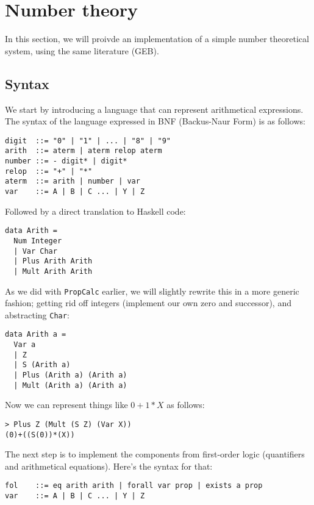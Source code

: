 \documentclass{article}
\begin{document}
\section{Number theory}

In this section, we will proivde an implementation of a simple number theoretical system, using the same literature (GEB).

\subsection{Syntax}

We start by introducing a language that can represent arithmetical expressions. The syntax of the language expressed in BNF (Backus-Naur Form) is as follows:

\begin{lstlisting}
digit  ::= "0" | "1" | ... | "8" | "9"
arith  ::= aterm | aterm relop aterm
number ::= - digit* | digit*
relop  ::= "+" | "*"
aterm  ::= arith | number | var
var    ::= A | B | C ... | Y | Z
\end{lstlisting}

Followed by a direct translation to Haskell code:

\begin{lstlisting}
data Arith =
  Num Integer
  | Var Char
  | Plus Arith Arith
  | Mult Arith Arith
\end{lstlisting}

As we did with \texttt{PropCalc} earlier, we will slightly rewrite this in a more generic fashion; getting rid off integers (implement our own zero and successor), and abstracting \texttt{Char}:

\begin{lstlisting}
data Arith a =
  Var a
  | Z
  | S (Arith a)
  | Plus (Arith a) (Arith a)
  | Mult (Arith a) (Arith a)
\end{lstlisting}

Now we can represent things like $0 + 1*X$ as follows:

\begin{lstlisting}
> Plus Z (Mult (S Z) (Var X))
(0)+((S(0))*(X))
\end{lstlisting}

The next step is to implement the components from first-order logic (quantifiers and arithmetical equations). Here's the syntax for that:

\begin{lstlisting}
fol    ::= eq arith arith | forall var prop | exists a prop
var    ::= A | B | C ... | Y | Z
\end{lstlisting}
\end{document}
